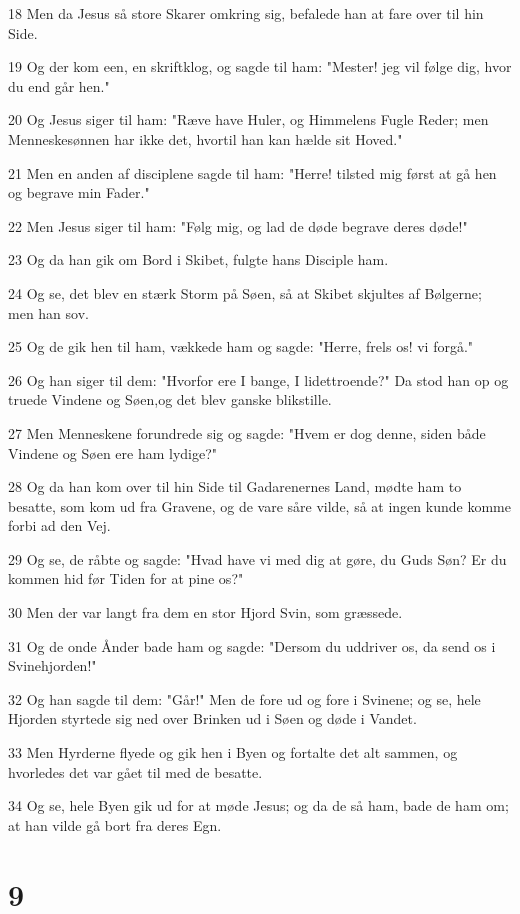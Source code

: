 \par 18 Men da Jesus så store Skarer omkring sig, befalede han at fare over til hin Side.
\par 19 Og der kom een, en skriftklog, og sagde til ham: "Mester! jeg vil følge dig, hvor du end går hen."
\par 20 Og Jesus siger til ham: "Ræve have Huler, og Himmelens Fugle Reder; men Menneskesønnen har ikke det, hvortil han kan hælde sit Hoved."
\par 21 Men en anden af disciplene sagde til ham: "Herre! tilsted mig først at gå hen og begrave min Fader."
\par 22 Men Jesus siger til ham: "Følg mig, og lad de døde begrave deres døde!"
\par 23 Og da han gik om Bord i Skibet, fulgte hans Disciple ham.
\par 24 Og se, det blev en stærk Storm på Søen, så at Skibet skjultes af Bølgerne; men han sov.
\par 25 Og de gik hen til ham, vækkede ham og sagde: "Herre, frels os! vi forgå."
\par 26 Og han siger til dem: "Hvorfor ere I bange, I lidettroende?" Da stod han op og truede Vindene og Søen,og det blev ganske blikstille.
\par 27 Men Menneskene forundrede sig og sagde: "Hvem er dog denne, siden både Vindene og Søen ere ham lydige?"
\par 28 Og da han kom over til hin Side til Gadarenernes Land, mødte ham to besatte, som kom ud fra Gravene, og de vare såre vilde, så at ingen kunde komme forbi ad den Vej.
\par 29 Og se, de råbte og sagde: "Hvad have vi med dig at gøre, du Guds Søn? Er du kommen hid før Tiden for at pine os?"
\par 30 Men der var langt fra dem en stor Hjord Svin, som græssede.
\par 31 Og de onde Ånder bade ham og sagde: "Dersom du uddriver os, da send os i Svinehjorden!"
\par 32 Og han sagde til dem: "Går!" Men de fore ud og fore i Svinene; og se, hele Hjorden styrtede sig ned over Brinken ud i Søen og døde i Vandet.
\par 33 Men Hyrderne flyede og gik hen i Byen og fortalte det alt sammen, og hvorledes det var gået til med de besatte.
\par 34 Og se, hele Byen gik ud for at møde Jesus; og da de så ham, bade de ham om; at han vilde gå bort fra deres Egn.

\chapter{9}

